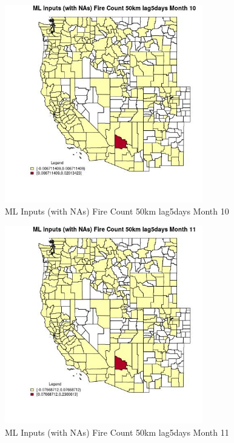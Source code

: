 \begin{figure} 
\centering  
\includegraphics[width=0.77\textwidth]{Code_Outputs/Report_ML_input_PM25_Step4_part_e_de_duplicated_aves_compiled_2019-05-20wNAs_CountyFire_Count_50km_lag5daysmedianMonth10.jpg} 
\caption{\label{fig:Report_ML_input_PM25_Step4_part_e_de_duplicated_aves_compiled_2019-05-20wNAsCountyFire_Count_50km_lag5daysmedianMonth10}ML Inputs (with NAs) Fire Count 50km lag5days Month 10} 
\end{figure} 
 

\begin{figure} 
\centering  
\includegraphics[width=0.77\textwidth]{Code_Outputs/Report_ML_input_PM25_Step4_part_e_de_duplicated_aves_compiled_2019-05-20wNAs_CountyFire_Count_50km_lag5daysmedianMonth11.jpg} 
\caption{\label{fig:Report_ML_input_PM25_Step4_part_e_de_duplicated_aves_compiled_2019-05-20wNAsCountyFire_Count_50km_lag5daysmedianMonth11}ML Inputs (with NAs) Fire Count 50km lag5days Month 11} 
\end{figure} 
 


